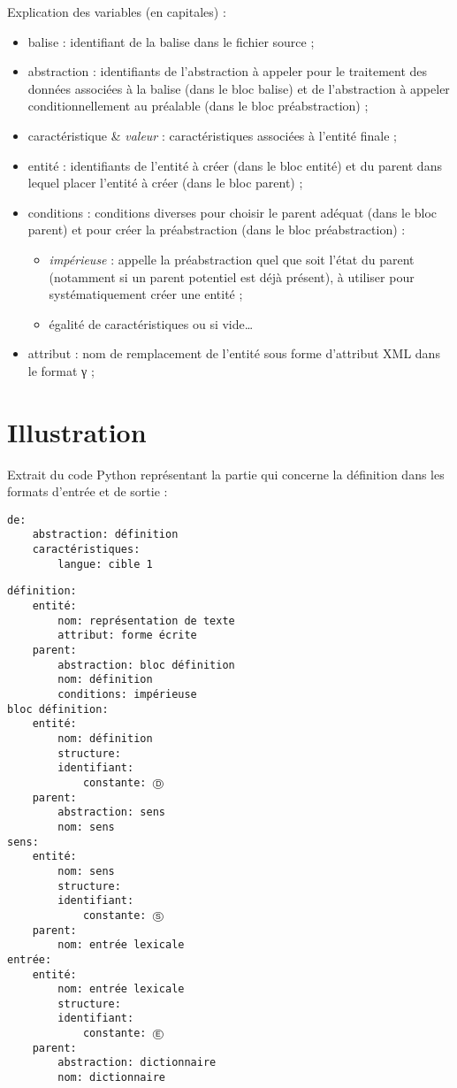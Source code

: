 \documentclass[10pt]{report}
\newcommand{\balise}[1]{\textcolor{red!80}{#1}}
\newcommand{\entité}[1]{\textcolor{blue!80!black}{#1}}
\newcommand{\caractéristique}[1]{\textcolor{green!60!black}{#1}}
\newcommand{\abstraction}[1]{\textcolor{blue!50!red}{#1}}
\begin{document}
Explication des variables (en capitales) :
\begin{itemize}
    \item \balise{\textsf{balise}} : identifiant de la balise dans le fichier source ;
    \item \abstraction{\textsf{abstraction}} : identifiants de l’abstraction à appeler pour le traitement des données associées à la balise (dans le bloc balise) et de l’abstraction à appeler conditionnellement au préalable (dans le bloc préabstraction) ;
    \item \caractéristique{\textsf{caractéristique}} \& \textit{\textsf{valeur}} : caractéristiques associées à l’entité finale ; 
    \item \entité{\textsf{entité}} : identifiants de l’entité à créer (dans le bloc entité) et du parent dans lequel placer l’entité à créer (dans le bloc parent) ; 
    \item \textsf{conditions} : conditions diverses pour choisir le parent adéquat (dans le bloc parent) et pour créer la préabstraction (dans le bloc préabstraction) :  
    \begin{itemize}
        \item \textit{impérieuse} : appelle la préabstraction quel que soit l’état du parent (notamment si un parent potentiel est déjà présent), à utiliser pour systématiquement créer une entité ;
        \item égalité de caractéristiques ou si vide…
    \end{itemize}
    \item \textsf{attribut} : nom de remplacement de l’entité sous forme d’attribut XML dans le format γ ; 
\end{itemize}

\section{Illustration}

Extrait du code Python représentant la partie qui concerne la définition dans les formats d’entrée et de sortie :

\begin{verbatim}
de:
    abstraction: définition
    caractéristiques:
        langue: cible 1
\end{verbatim}
\begin{verbatim}
définition:
    entité:
        nom: représentation de texte
        attribut: forme écrite
    parent:
        abstraction: bloc définition
        nom: définition
        conditions: impérieuse
bloc définition:
    entité:
        nom: définition
        structure:
        identifiant:
            constante: Ⓓ
    parent:
        abstraction: sens
        nom: sens
sens:
    entité:
        nom: sens
        structure:
        identifiant:
            constante: Ⓢ
    parent:
        nom: entrée lexicale
entrée:
    entité:
        nom: entrée lexicale
        structure:
        identifiant:
            constante: Ⓔ
    parent:
        abstraction: dictionnaire
        nom: dictionnaire
\end{verbatim}
\end{document}
